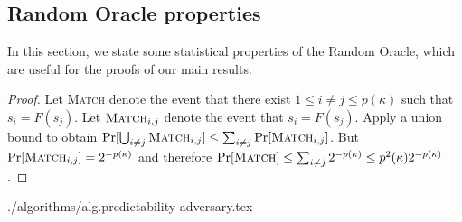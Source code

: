 \subsection{Random Oracle properties}

In this section, we state some statistical properties of the Random
Oracle, which are useful for the proofs of our main results.

\restateLemPerturbation*
\begin{proof}
  Let \textsc{Match} denote the event that there exist $1 \leq i \neq j \leq p(\kappa)$ such that $s_i = F(s_j)$.
  Let $\textsc{Match}_{i, j}$ denote the event that $s_i = F(s_j)$. Apply a union bound to obtain
  $
    \Pr[\bigcup_{i \neq j}\textsc{Match}_{i, j}] \leq \sum_{i \neq j} \Pr[\textsc{Match}_{i, j}]
  $.
  But $\Pr[\textsc{Match}_{i, j}] = 2^{-p(\kappa)}$ and therefore
  $\Pr[\textsc{Match}] \leq \sum_{i \neq j} 2^{-p(\kappa)} \leq p^2(\kappa) 2^{-p(\kappa)}$.
\end{proof}

{./algorithms/alg.predictability-adversary.tex}

